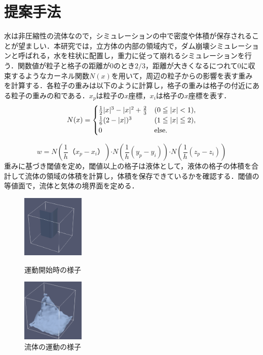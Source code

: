\documentclass[10pt,a4paper,notitlepage,oneside,twocolumn]{abst_jsarticle}
\begin{document}
\section{提案手法} \label{chapter:4}
水は非圧縮性の流体なので，シミュレーションの中で密度や体積が保存されることが望ましい．本研究では，立方体の内部の領域内で，ダム崩壊シミュレーションと呼ばれる，水を柱状に配置し，重力に従って崩れるシミュレーションを行う．関数値が粒子と格子の距離が0のとき$2/3$，距離が大きくなるにつれて0に収束するようなカーネル関数$N(x)$を用いて，周辺の粒子からの影響を表す重みを計算する．各粒子の重みは以下のように計算し，格子の重みは格子の付近にある粒子の重みの和である．$x_p$は粒子の$x$座標，$x_i$は格子の$x$座標を表す．
\begin{equation}\label{eq:kernel}
N (x)  = 
\begin{cases}
\frac{1}{2}|x|^3 - |x|^2 + \frac{2}{3} &  (0\leqq|x|<1),  \\
\frac{1}{6} (2-|x|) ^3 &  (1\leqq|x|\leqq2),  \\
0 & \rm{else}.
\end{cases}
\end{equation} 

\begin{equation}\label{eq:weight}
w= N(\frac{1}{h}（x_p - x_i）)\boldsymbol{\cdot}N(\frac{1}{h}(y_p - y_i))\boldsymbol{\cdot}N(\frac{1}{h}(z_p - z_i))
\end{equation} 
重みに基づき閾値を定め，閾値以上の格子は液体として，液体の格子の体積を合計して流体の領域の体積を計算し，体積を保存できているかを確認する．閾値の等値面で，流体と気体の境界面を定める．
\begin{figure}[htbp]
  \begin{minipage}[b]{0.45\linewidth}
    \centering
    \includegraphics[width=30mm]{pirror.png}
    \caption{運動開始時の様子}
  \end{minipage}
  \begin{minipage}[b]{0.45\linewidth}
    \centering
    \includegraphics[width=30mm]{simulation.png}
    \caption{流体の運動の様子}
  \end{minipage}
\end{figure}
\end{document}
